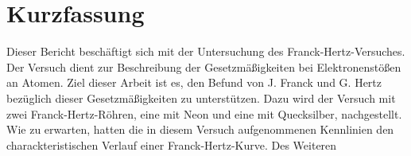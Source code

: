 
\section{Kurzfassung}

Dieser Bericht beschäftigt sich mit der Untersuchung des Franck-Hertz-Versuches.
Der Versuch dient zur Beschreibung der Gesetzmäßigkeiten bei Elektronenstößen an Atomen.
Ziel dieser Arbeit ist es, den Befund von J. Franck und G. Hertz bezüglich dieser Gesetzmäßigkeiten zu unterstützen.
Dazu wird der Versuch mit zwei Franck-Hertz-Röhren, eine mit Neon und eine mit Quecksilber, nachgestellt.
Wie zu erwarten, hatten die in diesem Versuch aufgenommenen Kennlinien den charackteristischen Verlauf einer Franck-Hertz-Kurve.
Des Weiteren %